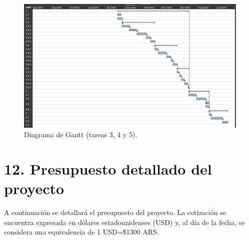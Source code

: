 \documentclass[
11pt, %
]{charter}
\begin{document}
\begin{landscape}
\begin{figure}
\centering 
\includegraphics[scale=0.7]{./Figuras/gantt_2.png}
\caption{Diagrama de Gantt (tareas 3, 4 y 5).}
\label{fig:gantt2}
\end{figure}

\end{landscape}





\section{12. Presupuesto detallado del proyecto}
\label{sec:presupuesto}

A continuación se detallará el presupuesto del proyecto. La cotización se encuentra expresada en dólares estadounidenses (USD) y, al día de la fecha, se considera una equivalencia de 1 USD=\$1300 ARS.
\end{document}
